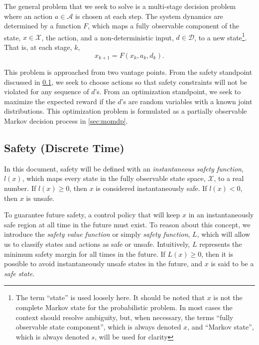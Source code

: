 \documentclass{article}
\newcommand{\aspace}{\ensuremath{\mathcal{A}} }
\begin{document}
The general problem that we seek to solve is a multi-stage decision problem where an action $a \in \aspace$ is chosen at each step.
The system dynamics are determined by a function $F$, which maps a fully observable component of the state, $x \in \mathcal{X}$, the action, and a non-deterministic input, $d \in \mathcal{D}$, to a new state\footnote{The term ``state'' is used loosely here. It should be noted that $x$ is not the complete Markov state for the probabilistic problem. In most cases the context should resolve ambiguity, but, when necessary, the terms ``fully observable state component'', which is always denoted $x$, and ``Markov state'', which is always denoted $s$, will be used for clarity}.
That is, at each stage, $k$,
\begin{equation}
    x_{k+1} = F(x_k, a_k, d_k) \text{.}
\end{equation}

This problem is approached from two vantage points.
From the safety standpoint discussed in \cref{sec:safety}, we seek to choose actions so that safety constraints will not be violated for any sequence of $d$'s.
From an optimization standpoint, we seek to maximize the expected reward if the $d$'s are random variables with a known joint distributions.
This optimization problem is formulated as a partially observable Markov decision process in \cref{sec:momdp}.

\subsection{Safety (Discrete Time)} \label{sec:safety}

In this document, safety will be defined with an \emph{instantaneous safety function}, $l(x)$, which maps every state in the fully observable state space, $\mathcal{X}$, to a real number.
If $l(x) \geq 0$, then $x$ is considered instantaneously safe. If $l(x) < 0$, then $x$ is unsafe.

To guarantee future safety, a control policy that will keep $x$ in an instantaneously safe region at all time in the future must exist.
To reason about this concept, we introduce the \emph{safety value function} or simply \emph{safety function}, $L$, which will allow us to classify states and actions as safe or unsafe.
Intuitively, $L$ represents the minimum safety margin for all times in the future.
If $L(x) \geq 0$, then it is possible to avoid instantaneously unsafe states in the future, and $x$ is said to be a \emph{safe state}.  
\end{document}
